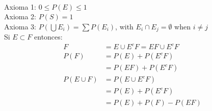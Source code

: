 \\[0.1cm]

Axioma 1: $0 \leq P(E) \leq 1$\\
Axioma 2: $P(S)=1$\\
Axioma 3: $P\left(\bigcup E_i \right) =  \sum P\left(E_i\right)$, with $E_i \cap E_j = \emptyset$ when $i\neq j$\\[0.5cm]


Si $E \subset F$ entonces:\\
\begin{align*}
F &= E \cup E^c F = EF \cup E^c F\\
P(F) &= P(E) + P(E^c F)\\
&= P(EF) + P(E^c F)\\
P(E\cup F) &= P(E\cup E^c F)\\
&= P(E) + P(E^c F)\\
&= P(E) + P(F) - P(EF)
\end{align*}
